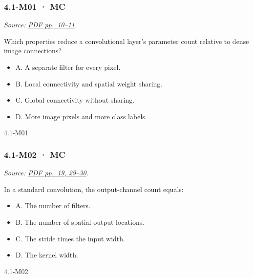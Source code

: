 \noindent\begin{minipage}{\linewidth}

\subsubsection{4.1-M01 · MC}\label{m01-mc-11}

\emph{Source: \href{../Lecture\%20Slides/4.1.\%20CNNs.pdf\#page=10}{PDF
pp.~10--11}.}

Which properties reduce a convolutional layer's parameter count relative
to dense image connections?

\begin{itemize}
\tightlist
\item
  A. A separate filter for every pixel.
\item
  B. Local connectivity and spatial weight sharing.
\item
  C. Global connectivity without sharing.
\item
  D. More image pixels and more class labels.
\end{itemize}

\begin{solution}[8mm]{4.1-M01}

\end{solution}
\end{minipage}\par\medskip

\noindent\begin{minipage}{\linewidth}

\subsubsection{4.1-M02 · MC}\label{m02-mc-11}

\emph{Source: \href{../Lecture\%20Slides/4.1.\%20CNNs.pdf\#page=19}{PDF
pp.~19, 29--30}.}

In a standard convolution, the output-channel count equals:

\begin{itemize}
\tightlist
\item
  A. The number of filters.
\item
  B. The number of spatial output locations.
\item
  C. The stride times the input width.
\item
  D. The kernel width.
\end{itemize}

\begin{solution}[8mm]{4.1-M02}

\end{solution}
\end{minipage}\par\medskip

